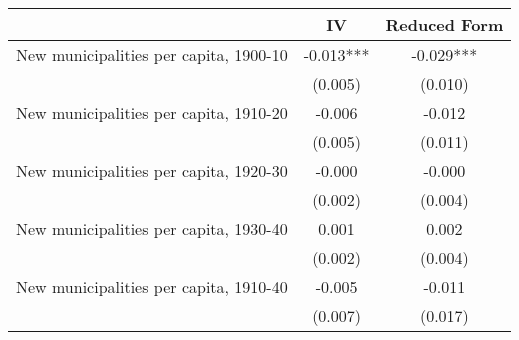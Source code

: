  \begin{tabular}{l*{2}{c}} \toprule
                &\multicolumn{1}{c}{IV}&\multicolumn{1}{c}{Reduced Form}\\
\midrule
New municipalities per capita, 1900-10&   -0.013***&   -0.029***\\
                &  (0.005)   &  (0.010)   \\
\addlinespace
New municipalities per capita, 1910-20&   -0.006   &   -0.012   \\
                &  (0.005)   &  (0.011)   \\
\addlinespace
New municipalities per capita, 1920-30&   -0.000   &   -0.000   \\
                &  (0.002)   &  (0.004)   \\
\addlinespace
New municipalities per capita, 1930-40&    0.001   &    0.002   \\
                &  (0.002)   &  (0.004)   \\
\addlinespace
New municipalities per capita, 1910-40&   -0.005   &   -0.011   \\
                &  (0.007)   &  (0.017)   \\
       \bottomrule \end{tabular}
